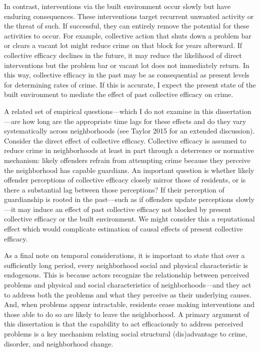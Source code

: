\documentclass [11pt, proquest] {uwthesis}[2015/03/03]
\begin{document}
In contrast, interventions via the built environment occur slowly but have enduring consequences. These interventions target recurrent unwanted activity or the threat of such. If successful, they can entirely remove the potential for these activities to occur. For example, collective action that shuts down a problem bar or clears a vacant lot might reduce crime on that block for years afterward. If collective efficacy declines in the future, it may reduce the likelihood of direct interventions but the problem bar or vacant lot does not immediately return. In this way, collective efficacy in the past may be as consequential as present levels for determining rates of crime. If this is accurate, I expect the present state of the built environment to mediate the effect of past collective efficacy on crime.

A related set of empirical questions---which I do not examine in this dissertation---are how long are the appropriate time lags for these effects and do they vary systematically across neighborhoods (see Taylor 2015 for an extended discussion). Consider the direct effect of collective efficacy. Collective efficacy is assumed to reduce crime in neighborhoods at least in part through a deterrence or normative mechanism: likely offenders refrain from attempting crime because they perceive the neighborhood has capable guardians. An important question is whether likely offender perceptions of collective efficacy closely mirror those of residents, or is there a substantial lag between those perceptions? If their perception of guardianship is rooted in the past---such as if offenders update perceptions slowly---it may induce an effect of past collective efficacy not blocked by present collective efficacy or the built environment. We might consider this a reputational effect which would complicate estimation of causal effects of present collective efficacy.

As a final note on temporal considerations, it is important to state that over a sufficiently long period, every neighborhood social and physical characteristic is endogenous. This is because actors recognize the relationship between perceived problems and physical and social characteristics of neighborhoods---and they act to address both the problems and what they perceive as their underlying causes. And, when problems appear intractable, residents cease making interventions and those able to do so are likely to leave the neighborhood. A primary argument of this dissertation is that the capability to act efficaciously to address perceived problems is a key mechanism relating social structural (dis)advantage to crime, disorder, and neighborhood change.
\end{document}
